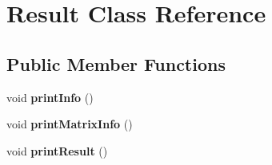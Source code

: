 \hypertarget{classResult}{
\section{Result Class Reference}
\label{classResult}
}
\subsection*{Public Member Functions}
\begin{DoxyCompactItemize}
\item 
\hypertarget{classResult_a5235cad2b14b69ee69405a2c425ac58e}{
void {\bfseries printInfo} ()}
\label{classResult_a5235cad2b14b69ee69405a2c425ac58e}

\item 
\hypertarget{classResult_a35d12d80d3226b04b521b4935f306eea}{
void {\bfseries printMatrixInfo} ()}
\label{classResult_a35d12d80d3226b04b521b4935f306eea}

\item 
\hypertarget{classResult_adbd8c390724b16f7b88da3036fa26307}{
void {\bfseries printResult} ()}
\label{classResult_adbd8c390724b16f7b88da3036fa26307}

\end{DoxyCompactItemize}

